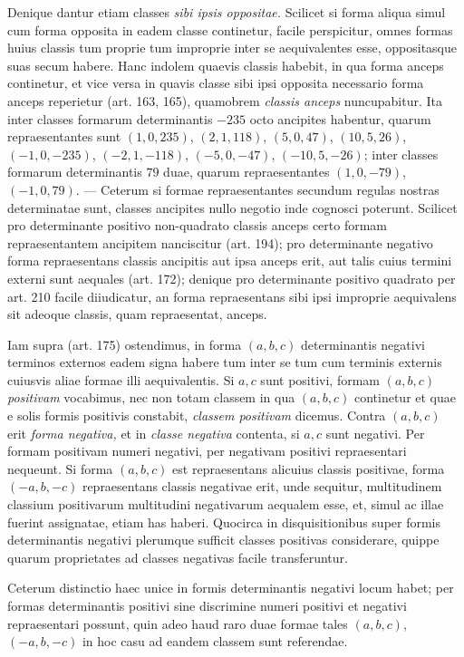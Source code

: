 Denique dantur etiam classes \textit{sibi ipsis oppositae.} Scilicet si forma aliqua
simul cum forma opposita in eadem classe continetur, facile perspicitur, omnes
formas huius classis tum proprie tum improprie inter se aequivalentes esse,
oppositasque suas secum habere. Hanc indolem quaevis classis habebit, in qua forma
anceps continetur, et vice versa in quavis classe sibi ipsi opposita necessario
forma anceps reperietur (art. 163, 165), quamobrem \textit{classis anceps}
nuncupabitur. Ita inter classes formarum determinantis $-235$ octo ancipites
habentur, quarum repraesentantes sunt $(1,0,235)$, $(2,1,118)$, $(5,0,47)$,
$(10,5,26)$, $(-1,0,-235)$, $(-2,1,-118)$, $(-5,0,-47)$,
$(-10,5,-26)$; inter classes formarum determinantis $79$ duae, quarum
repraesentantes $(1,0,-79)$, $(-1,0,79)$. --- Ceterum si formae
repraesentantes secundum regulas nostras determinatae sunt, classes ancipites
nullo negotio inde cognosci poterunt. Scilicet pro determinante positivo
non-quadrato classis anceps certo formam repraesentantem ancipitem nanciscitur
(art. 194); pro determinante negativo forma repraesentans classis ancipitis aut
ipsa anceps erit, aut talis cuius termini externi sunt aequales (art. 172);
denique pro determinante positivo quadrato per art. 210 facile diiudicatur,
an forma repraesentans sibi ipsi improprie aequivalens sit adeoque classis,
quam repraesentat, anceps.

Iam supra (art. 175) ostendimus, in forma $(a,b,c)$ determinantis negativi
terminos externos eadem signa habere tum inter se tum cum terminis externis
cuiusvis aliae formae illi aequivalentis. Si $a,c$ sunt positivi, formam
$(a,b,c)$ \textit{positivam} vocabimus, nec non totam classem in qua $(a,b,c)$
continetur et quae e solis formis positivis constabit, \textit{classem positivam}
dicemus. Contra $(a,b,c)$ erit \textit{forma negativa,} et in \textit{classe
negativa} contenta, si $a,c$ sunt negativi. Per formam positivam numeri negativi,
per negativam positivi repraesentari nequeunt. Si forma $(a,b,c)$ est
repraesentans alicuius classis positivae, forma $(-a,b,-c)$ repraesentans classis
negativae erit, unde sequitur, multitudinem classium positivarum multitudini
negativarum aequalem esse, et, simul ac illae fuerint assignatae, etiam has haberi.
Quocirca in disquisitionibus super formis determinantis negativi plerumque sufficit
classes positivas considerare, quippe quarum proprietates ad classes negativas
facile transferuntur.

Ceterum distinctio haec unice in formis determinantis negativi locum habet;
per formas determinantis positivi sine discrimine numeri positivi et negativi
repraesentari possunt, quin adeo haud raro duae formae tales $(a,b,c)$,
$(-a,b,-c)$ in hoc casu ad eandem classem sunt referendae.

